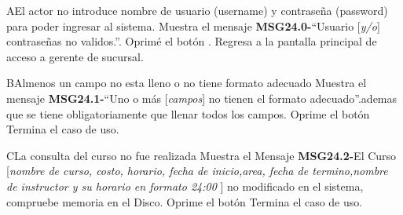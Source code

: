 \begin{UCtrayectoriaA}{A}{El actor no introduce nombre de usuario (username) y contraseña (password) para poder ingresar al sistema.}
			\UCpaso Muestra el mensaje {\bf MSG24.0-}``Usuario [{\em y/o}] contraseñas no validos.''.
			\UCpaso[\UCactor] Oprimé el botón .
			\UCpaso Regresa a la pantalla principal de acceso a gerente de sucursal.
		\end{UCtrayectoriaA}

		\begin{UCtrayectoriaA}{B}{Almenos un campo no esta lleno o no tiene formato adecuado}
			\UCpaso Muestra el mensaje {\bf MSG24.1-}``Uno o más [{\em campos}] no tienen el formato adecuado''.ademas que se tiene obligatoriamente que llenar todos los campos.
			\UCpaso[\UCactor] Oprime el botón 
			\UCpaso[] Termina el caso de uso.
		\end{UCtrayectoriaA}
		
		\begin{UCtrayectoriaA}{C}{La consulta del curso no fue realizada }
			\UCpaso Muestra el Mensaje {\bf MSG24.2-}El Curso [{\em nombre de curso, costo, horario, fecha de inicio,area, fecha de termino,nombre de instructor y su  horario en formato 24:00 }] no modificado en el sistema, compruebe memoria en el Disco.
			\UCpaso[\UCactor] Oprime el botón 
			\UCpaso[] Termina el caso de uso.
		\end{UCtrayectoriaA}	
